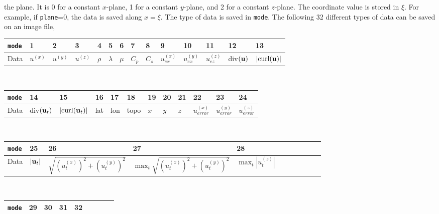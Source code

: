 \documentclass[11pt]{report}
\newcommand{\ub}{{\bf u}}
\begin{document}
{the plane. It is 0 for a constant $x$-plane, 1 for a constant $y$-plane, and 2 for a constant
$z$-plane. The coordinate value is stored in $\xi$. For example, if {\tt plane}=0, the data is saved
along $x=\xi$. The type of data is saved in {\tt mode}. The following 32 different types of data can
be saved on an image file,
\begin{flushleft}
	\begin{tabular}{l||l|l|l|l|l|l|l|l|l|l|l|l|l}\hline
		{\tt mode} & 1              & 2              & 3          & 4                      & 5         & 6     & 7     & 8     & 9              & 10 & 11 & 12 & 13 \\ \hline
		Data       & $u^{(x)}$      & $u^{(y)}$      & $u^{(z)}$  & $\rho$                 & $\lambda$ & $\mu$ & $C_p$ & $C_s$ & $u_{ex}^{(x)}$
		           & $u_{ex}^{(y)}$ & $u_{ez}^{(z)}$ & div$(\ub)$ & $|\mbox{curl($\ub$)}|$                                                                          \\ \hline
	\end{tabular}\\
	\medskip
	\begin{tabular}{l||l|l|l|l|l|l|l|l|l|l|l}\hline
		{\tt mode} & 14           & 15                       & 16  & 17                & 18                & 19                & 20 & 21 & 22 & 23 & 24 \\ \hline\hline
		Data       & div$(\ub_t)$ & $|\mbox{curl($\ub_t$)}|$ & lat & lon               &
		topo       & $x$          & $y$                      & $z$ & $u_{error}^{(x)}$ & $u_{error}^{(y)}$ & $u_{error}^{(z)}$                          \\ \hline
	\end{tabular}\\
	\medskip
	\begin{tabular}{l||l|l|l|lllllll}\hline
		{\tt mode} & 25                                & 26                                   & 27                                         & 28 \\ \hline
		Data       & $|\ub_t|$                         & $\sqrt{(u_t^{(x)})^2+(u_t^{(y)})^2}$ & $\max_t\sqrt{(u_t^{(x)})^2+(u_t^{(y)})^2}$
		           & $\max_t \left| u^{(z)}_t \right|$
		\\ \hline
	\end{tabular}\\
	\medskip
	\begin{tabular}{l||l|l|l|lllll}\hline
		{\tt mode} & 29      & 30                               & 31                                     & 32      \\ \hline

\end{tabular}
\end{flushleft}}
\end{document}
